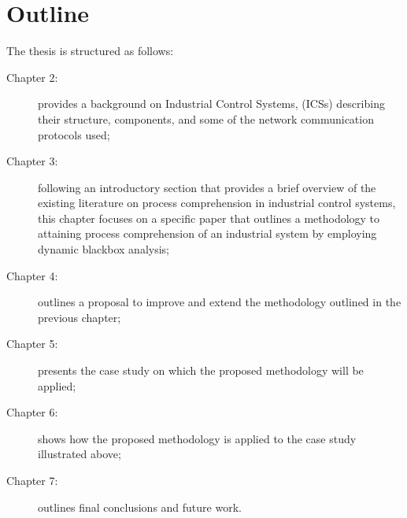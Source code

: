 \section{Outline}
\label{sec:outline}
\noindent The thesis is structured as follows:

\begin{description}
	\item [Chapter 2:] provides a background on Industrial Control Systems, (ICSs) describing their structure, components, and some of the network communication protocols used;
	\item [Chapter 3:] following an introductory section that provides a brief overview of the existing literature on process comprehension in industrial control systems, this chapter focuses on a specific paper that outlines a methodology to attaining process comprehension of an industrial system by employing dynamic blackbox analysis;
	\item [Chapter 4:] outlines a proposal to improve and extend the methodology outlined in the previous chapter;
	\item [Chapter 5:] presents the case study on which the proposed methodology will be applied;
	\item [Chapter 6:] shows how the proposed methodology is applied to the case study illustrated above;
	\item [Chapter 7:] outlines final conclusions and future work.
\end{description}

\vfill
\nolinenumbers